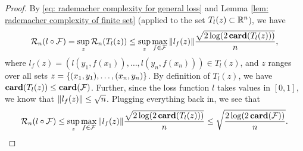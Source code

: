 \begin{proof}
By \eqref{eq: rademacher complexity for general loss} and Lemma \ref{lem: rademacher complexity of finite set} (applied to the set $T_l(z) \subset \mathbb{R}^n$), we have
\[
    \mathcal{R}_n(l \circ \mathcal{F}) = \sup_z \mathcal{R}_n(T_l(z)) \leq \sup_z \max_{f \in \mathcal{F}} \norm{l_f(z)} \frac{\sqrt{2 \log(2 \, \mathrm{\mathbf{card}}(T_l(z)))}}{n},
\]
where $l_f(z) = ( l(y_1, f(x_1)), \dots, l(y_n, f(x_n)) ) \in T_l(z)$, and $z$ ranges over all sets $z = \left\{(x_1, y_1), \dots, (x_n, y_n)\right\}$. By definition of $T_l(z)$, we have $\mathrm{\mathbf{card}}(T_l(z)) \leq \mathrm{\mathbf{card}}(\mathcal{F})$. Further, since the loss function $l$ takes values in $[0, 1]$, we know that $\norm{l_f(z)} \leq \sqrt{n}$. Plugging everything back in, we see that
\[
    \mathcal{R}_n(l \circ \mathcal{F}) \leq \sup_z \max_{f \in \mathcal{F}} \norm{l_f(z)} \frac{\sqrt{2 \log(2 \, \mathrm{\mathbf{card}}(T_l(z)))}}{n} \leq \sqrt{\frac{2 \log(2 \, \mathrm{\mathbf{card}}(\mathcal{F}))}{n}}.
\]
\end{proof}
